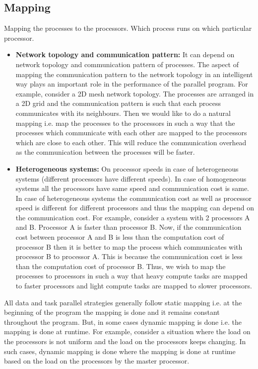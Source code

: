 \documentclass[12pt]{article}
\begin{document}
\subsection{Mapping}
Mapping the processes to the processors. 
Which process runs on which particular processor.
\begin{itemize}
    \item \textbf{Network topology and communication pattern: }It can depend on network topology and communication pattern of processes. The aspect of mapping the communication pattern to the network topology in an intelligent way plays an important role in the performance of the parallel program.
          For example, consider a 2D mesh network topology. The processes are arranged in a 2D grid and the communication pattern is such that each process communicates with its neighbours. Then we would like to do a natural mapping i.e. map the 
            processes to the processors in such a way that the processes which communicate with each other are mapped to the processors which are close to each other. This will reduce the communication overhead as the communication between the processes will be faster.
          
    \item \textbf{Heterogeneous systems: }On processor speeds in case of heterogeneous systems (different processors have different speeds). In case of homogeneous systems all the processors have same speed and communication cost is same.
          In case of heterogeneous systems the communication cost as well as processor speed is different for different processors and thus the mapping can depend on the communication cost. For example, consider a system with 2 processors A and B. Processor A is faster than processor B.
            Now, if the communication cost between processor A and B is less than the computation cost of processor B then it is better to map the process which communicates with processor B to processor A. This is because the communication cost is less than the computation cost of processor B. Thus, we wish to map the processes 
            to processors in such a way that heavy compute tasks are mapped to faster processors and light compute tasks are mapped to slower processors.
\end{itemize}
All data and task parallel strategies generally follow static mapping i.e. at the beginning of the program the mapping is done and it remains constant throughout the program.
But, in some cases dynamic mapping is done i.e. the mapping is done at runtime. For example, consider a situation where the load on the processors is not uniform and the load on the processors keeps changing. In such cases, dynamic mapping is done where the mapping is done at runtime based on the load on the processors by the master processor.
\end{document}

